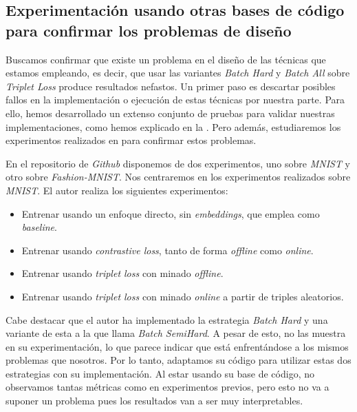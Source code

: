 \subsection{Experimentación usando otras bases de código para confirmar los problemas de diseño} \label{isubsec:experiemntacion_base_codigo_externa}

Buscamos confirmar que existe un problema en el diseño de las técnicas que estamos empleando, es decir, que usar las variantes \textit{Batch Hard} y \textit{Batch All} sobre \textit{Triplet Loss} produce resultados nefastos. Un primer paso es descartar posibles fallos en la implementación o ejecución de estas técnicas por nuestra parte. Para ello, hemos desarrollado un extenso conjunto de pruebas para validar nuestras implementaciones, como hemos explicado en la . Pero además, estudiaremos los experimentos realizados en \cite{informatica:adambielski_github} para confirmar estos problemas.

En el repositorio de \textit{Github} \cite{informatica:adambielski_github} disponemos de dos experimentos, uno sobre \textit{MNIST} y otro sobre \textit{Fashion-MNIST}. Nos centraremos en los experimentos realizados sobre \textit{MNIST}. El autor realiza los siguientes experimentos:

\begin{itemize}
    \item Entrenar usando un enfoque directo, sin \textit{embeddings}, que emplea como \textit{baseline}.
    \item Entrenar usando \textit{contrastive loss}, tanto de forma \textit{offline} como \textit{online}.
    \item Entrenar usando \textit{triplet loss} con minado \textit{offline}.
    \item Entrenar usando \textit{triplet loss} con minado \textit{online} a partir de triples aleatorios.
\end{itemize}

Cabe destacar que el autor ha implementado la estrategia \textit{Batch Hard} y una variante de esta a la que llama \textit{Batch SemiHard}. A pesar de esto, no las muestra en su experimentación, lo que parece indicar que está enfrentándose a los mismos problemas que nosotros. Por lo tanto, adaptamos su código para utilizar estas dos estrategias con su implementación. Al estar usando su base de código, no observamos tantas métricas como en experimentos previos, pero esto no va a suponer un problema pues los resultados van a ser muy interpretables.

